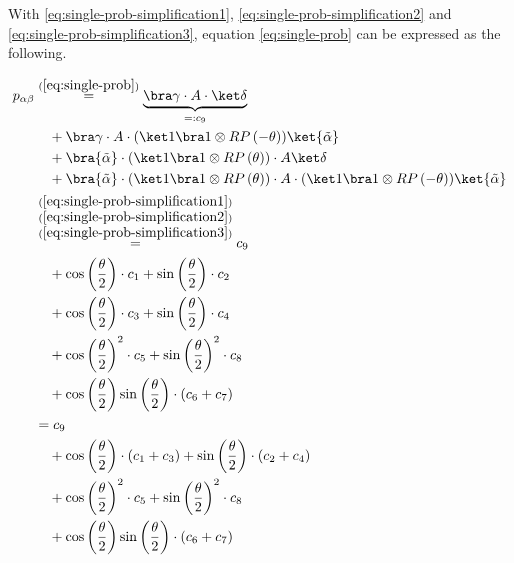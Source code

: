 With \ref{eq:single-prob-simplification1},
\ref{eq:single-prob-simplification2} and \ref{eq:single-prob-simplification3},
equation \ref{eq:single-prob} can be expressed as the following.

\begin{equation}
    \label{eq:single-prob-simplified}
    \begin{split}
        p_{\alpha\beta}
            &\stackrel{(\ref{eq:single-prob})}= \underbrace{\bra\gamma \cdot A \cdot \ket\delta}_{=: c_9} \\
                &\quad + \bra\gamma \cdot A \cdot (\ket 1 \bra 1 \otimes RP\left(-\theta\right)) \ket{\tilde\alpha} \\
                &\quad + \bra{\tilde\alpha} \cdot (\ket 1 \bra 1 \otimes RP\left(\theta\right)) \cdot A \ket\delta \\
                &\quad + \bra{\tilde\alpha} \cdot (\ket 1 \bra 1 \otimes RP\left(\theta\right)) \cdot A \cdot (\ket 1 \bra 1 \otimes RP\left(-\theta\right)) \ket{\tilde\alpha} \\
            &\stackrel{\substack{(\ref{eq:single-prob-simplification1})\\(\ref{eq:single-prob-simplification2})\\(\ref{eq:single-prob-simplification3})}}=
                c_9 \\
                &\quad + \cos\left(\frac\theta2\right) \cdot c_1 + \sin\left(\frac\theta2\right) \cdot c_2 \\
                &\quad + \cos\left(\frac\theta2\right) \cdot c_3 + \sin\left(\frac\theta2\right) \cdot c_4 \\
                &\quad + \cos\left(\frac\theta2\right)^2 \cdot c_5 + \sin\left(\frac\theta2\right)^2 \cdot c_8 \\
                &\quad + \cos\left(\frac\theta2\right)\sin\left(\frac\theta2\right) \cdot \left(c_6 + c_7\right) \\
            &= c_9 \\
                &\quad + \cos\left(\frac\theta2\right) \cdot \left(c_1 + c_3\right) + \sin\left(\frac\theta2\right) \cdot \left(c_2 + c_4\right) \\
                &\quad + \cos\left(\frac\theta2\right)^2 \cdot c_5 + \sin\left(\frac\theta2\right)^2 \cdot c_8 \\
                &\quad + \cos\left(\frac\theta2\right)\sin\left(\frac\theta2\right) \cdot \left(c_6 + c_7\right) \\
    \end{split}
\end{equation}

